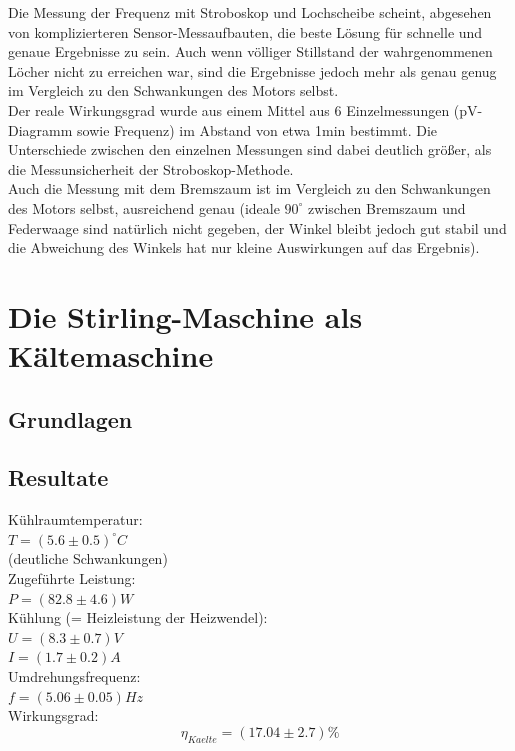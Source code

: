 \documentclass[12pt,a4paper]{article}
\begin{document}
\begin{multicols}{2}
\noindent Die Messung der Frequenz mit Stroboskop und Lochscheibe scheint, abgesehen von komplizierteren Sensor-Messaufbauten, die beste Lösung für schnelle und genaue Ergebnisse zu sein. Auch wenn völliger Stillstand der wahrgenommenen Löcher nicht zu erreichen war, sind die Ergebnisse jedoch mehr als genau genug im Vergleich zu den Schwankungen des Motors selbst.\\
Der reale Wirkungsgrad wurde aus einem Mittel aus 6 Einzelmessungen (pV-Diagramm sowie Frequenz) im Abstand von etwa 1min bestimmt. Die Unterschiede zwischen den einzelnen Messungen sind dabei deutlich größer, als die Messunsicherheit der Stroboskop-Methode.\\
Auch die Messung mit dem Bremszaum ist im Vergleich zu den Schwankungen des Motors selbst, ausreichend genau (ideale $90^\circ$ zwischen Bremszaum und Federwaage sind natürlich nicht gegeben, der Winkel bleibt jedoch gut stabil und die Abweichung des Winkels hat nur kleine Auswirkungen auf das Ergebnis).



\section{Die Stirling-Maschine als Kältemaschine}

\subsection{Grundlagen}


\subsection{Resultate}


Kühlraumtemperatur:\\ 
$T= (5.6 \pm 0.5)^{\circ}C$\\
\indent (deutliche Schwankungen)\\
Zugeführte Leistung:\\
$P=(82.8 \pm 4.6)W$\\
\noindent Kühlung (= Heizleistung der Heizwendel):\\ 
$U= (8.3 \pm 0.7)V$\\
$I = (1.7 \pm 0.2)A$\\
\noindent Umdrehungsfrequenz:\\
$f = (5.06\pm 0.05)Hz$\\
Wirkungsgrad:\\
$$\eta_{Kaelte}=(17.04\pm 2.7)\%$$


\end{multicols}
\end{document}
